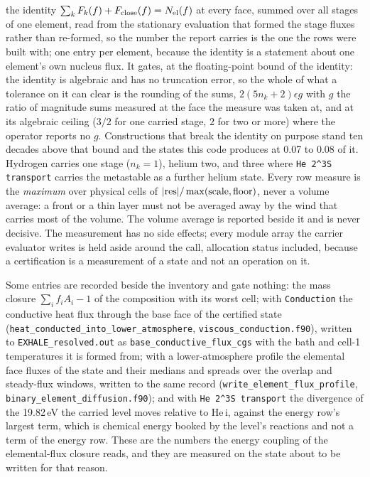 the identity $\sum_k F_k(f) + F_{\rm close}(f) = N_{\rm el}(f)$ at every
face, summed over all stages of one element, read from the stationary
evaluation that formed the stage fluxes rather than re-formed, so the number
the report carries is the one the rows were built with; one entry per
element, because the identity is a statement about one element's own nucleus
flux.  It gates, at the floating-point bound of the identity: the identity is
algebraic and has no truncation error, so the whole of what a tolerance on it
can clear is the rounding of the sums, $2(5n_k+2)\epsilon g$ with $g$ the
ratio of magnitude sums measured at the face the measure was taken at, and at
its algebraic ceiling ($3/2$ for one carried stage, $2$ for two or more) where the
operator reports no $g$.  Constructions that break the identity on purpose
stand ten decades above that bound and the states this code produces at 0.07
to 0.08 of it.  Hydrogen carries one stage ($n_k = 1$), helium two, and three
where \texttt{He 2\^{}3S transport} carries the metastable as a further
helium state.  Every row measure is
the \emph{maximum} over physical cells of $|{\rm res}|/\max({\rm scale},
{\rm floor})$, never a volume average: a front or a thin layer must not be
averaged away by the wind that carries most of the volume.  The volume average
is reported beside it and is never decisive.  The measurement has no side
effects; every module array the carrier evaluator writes is held aside around
the call, allocation status included, because a certification is a measurement
of a state and not an operation on it.

Some entries are recorded beside the inventory and gate nothing: the mass
closure $\sum_i f_iA_i - 1$ of the composition with its worst cell; with
\texttt{Conduction} the conductive heat flux through the base face of the
certified state (\texttt{heat\_conducted\_into\_lower\_atmosphere},
\texttt{viscous\_conduction.f90}), written to \texttt{EXHALE\_resolved.out}
as \texttt{base\_conductive\_flux\_cgs} with the bath and cell-1
temperatures it is formed from; with a lower-atmosphere profile the elemental
face fluxes of the state and their medians and spreads over the overlap and
steady-flux windows, written to the same record
(\texttt{write\_element\_flux\_profile},
\texttt{binary\_element\_diffusion.f90}); and with \texttt{He 2\^{}3S
transport} the divergence of the 19.82\,eV the carried level moves relative
to He\,{\sc i}, against the energy row's largest term, which is chemical
energy booked by the level's reactions and not a term of the energy row.
These are the numbers the energy coupling of the elemental-flux closure
reads, and they are measured on the state about to be written for that
reason.

